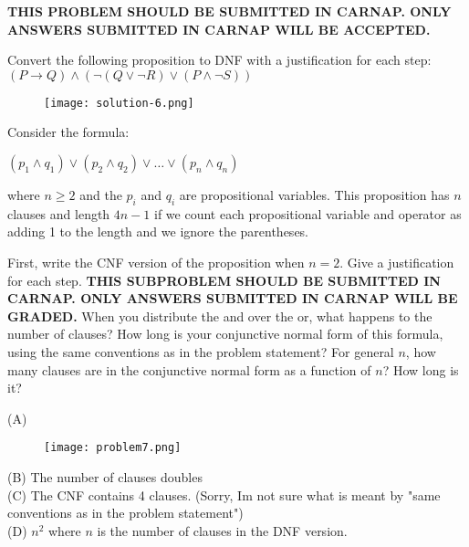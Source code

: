 \documentclass[solution,letterpaper]{cs20}
\begin{document}
\begin{problem}
{\bf THIS PROBLEM SHOULD BE SUBMITTED IN CARNAP. ONLY ANSWERS SUBMITTED IN CARNAP WILL BE ACCEPTED. }

    Convert the following proposition to DNF with a justification for each step: $(P \to Q) \land (\neg(Q \vee \neg R) \lor (P \land \neg S))$ \\

    \begin{solution}
        \begin{figure}[H]
            \centering
            \texttt{[image: solution-6.png]}
        \end{figure}
    \end{solution}
\end{problem}
\pagebreak

\begin{problem}
    Consider the formula:

    $(p_1 \land q_1) \lor (p_2 \land q_2) \lor \ldots \lor (p_n \land q_n)$

    where $n \geq 2$ and the $p_i$ and $q_i$ are propositional variables. This proposition has $n$ clauses and length $4n - 1$ if we count each propositional variable and operator as adding 1 to the length and we ignore the parentheses.

    \subproblem First, write the CNF version of the proposition when $n = 2$. Give a justification for each step.  {\bf THIS SUBPROBLEM SHOULD BE SUBMITTED IN CARNAP. ONLY ANSWERS SUBMITTED IN CARNAP WILL BE GRADED. }
    \subproblem When you distribute the and over the or, what happens to the number of clauses?
    \subproblem How long is your conjunctive normal form of this formula, using the same conventions as in the problem statement?
    \subproblem For general $n$, how many clauses are in the conjunctive normal form as a function of $n$? How long is it?

    \begin{solution}
    (A) \begin{figure}[H]
            \centering
            \texttt{[image: problem7.png]}
    \end{figure}
    (B) The number of clauses doubles \\
    (C) The CNF contains 4 clauses. (Sorry, Im not sure what is meant by "same conventions as in the problem statement")\\
    (D) $n^2$ where $n$ is the number of clauses in the DNF version.
    \end{solution}
\end{problem}
\pagebreak
\end{document}
